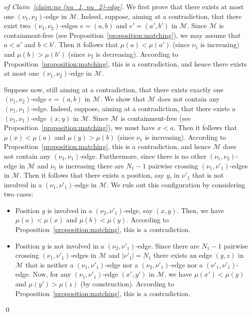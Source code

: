 \documentclass[a4paper,10pt]{llncs}
\begin{document}
\begin{proof}[of Claim~\ref{claim:no (nu_1, nu_2)-edge}]
  We first prove that there exists at most one
  $(\nu_1, \nu_2)$-edge in $\mathcal{M}$.
  Indeed, suppose, aiming at a contradiction, that there exist
  two $(\nu_1, \nu_2)$-edges $e = (a, b)$ and $e' = (a', b')$ in $\mathcal{M}$.
  Since $\mathcal{M}$ is containment-free (see Proposition~\ref{proposition:matching}),
  we may assume that $a < a'$ and $b < b'$.
  Then it follows that $\mu(a) < \mu(a')$
  (since $\nu_1$ is increasing) and $\mu(b) > \mu(b')$
  (since $\nu_2$ is decreasing).
  According to Proposition~\ref{proposition:matching}, this is
  a contradiction, and hence
  there exists at most one
  $(\nu_1, \nu_2)$-edge in $\mathcal{M}$.

  Suppose now, still aiming at a contradiction, that there exists
  exactly one $(\nu_1, \nu_2)$-edge $e = (a, b)$ in $\mathcal{M}$.
  We show that $\mathcal{M}$ does not contain any $(\nu_1, \nu_1)$-edge.
  Indeed, suppose, aiming at a contradiction,
  that there exists a $(\nu_1, \nu_1)$-edge $(x, y)$ in $\mathcal{M}$.
  Since $\mathcal{M}$ is containment-free (see Proposition~\ref{proposition:matching}),
  we must have $x < a$.
  Then it follows that $\mu(x) < \mu(a)$ and $\mu(y) > \mu(b)$
  (since $\nu_1$ is increasing).
  According to Proposition~\ref{proposition:matching}, this is
  a contradiction, and hence $\mathcal{M}$ does not contain any
  $(\nu_1, \nu_1)$-edge.
  Furthermore, since there is no other $(\nu_1, \nu_2)$-edge in $\mathcal{M}$ and
  $\nu_1$ is increasing there are $N_1-1$ pairwise crossing $(\nu_1, \nu'_1)$-edges
  in $\mathcal{M}$.
  Then it follows that there exists a position, say $y$, in $\nu'_1$ that is
  not involved in a $(\nu_1, \nu'_1)$-edge in $\mathcal{M}$.
  We rule out this configuration by considering two cases:
  \begin{itemize}
    \item Position $y$ is involved in a $(\nu_2, \nu'_1)$-edge,
    say $(x, y)$. Then, we have $\mu(a) < \mu(x)$ and $\mu(b) < \mu(y)$.
    According to Proposition~\ref{proposition:matching}, this is
    a contradiction.
    \item Position $y$ is not involved in a $(\nu_2, \nu'_1)$-edge.
    Since there are $N_1-1$ pairwise crossing $(\nu_1, \nu'_1)$-edges
    in $\mathcal{M}$ and $|\nu'_1| = N_1$ there exists an edge $(y, z)$ in $\mathcal{M}$
    that is neither a $(\nu_1, \nu'_1)$-edge nor a $(\nu_2, \nu'_1)$-edge
    nor a $(\nu'_1, \nu'_1)$-edge.
    Now, for any $(\nu_1, \nu'_1)$-edge $(x', y')$ in $\mathcal{M}$, we
    have $\mu(x') < \mu(y)$ and $\mu(y') > \mu(z)$ (by construction).
    According to Proposition~\ref{proposition:matching}, this is
    a contradiction.
  \end{itemize}
  \qed
\end{proof}
\end{document}
